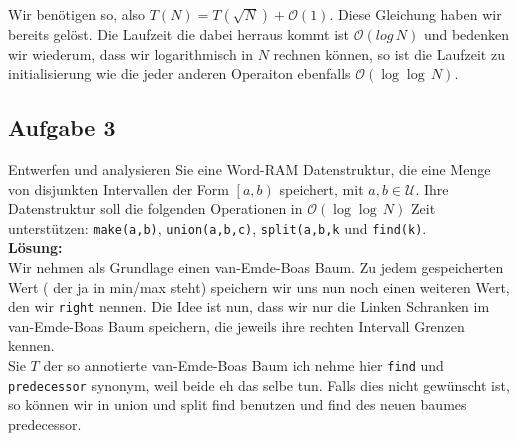 \documentclass[11pt,a4paper,ngerman]{article}
\begin{document}
Wir benötigen so, also $T(N) = T(\sqrt{N}) + \mathcal{O}(1)$. Diese Gleichung haben wir bereits gelöst. Die Laufzeit die dabei herraus kommt ist $\mathcal{O}(log \, N)$ und bedenken wir wiederum, dass wir logarithmisch in $N$ rechnen können, so ist die Laufzeit zu initialisierung wie die jeder anderen Operaiton ebenfalls $\mathcal{O}(\log \log \, N)$.

\subsection*{Aufgabe 3}

Entwerfen und analysieren Sie eine Word-RAM Datenstruktur, die eine Menge von disjunkten Intervallen der Form $\left[a,b\right)$ speichert, mit $a,b \in \mathcal{U}$. Ihre Datenstruktur soll die folgenden Operationen in $\mathcal{O}(\log\log \, N)$ Zeit unterstützen: \lstinline|make(a,b)|, \lstinline|union(a,b,c)|, \lstinline|split(a,b,k| und \lstinline|find(k)|.\\

\noindent\textbf{Lösung:}\\

Wir nehmen als Grundlage einen van-Emde-Boas Baum. Zu jedem gespeicherten Wert ( der ja in min/max steht) speichern wir uns nun noch einen weiteren Wert, den wir \lstinline|right| nennen. Die Idee ist nun, dass wir nur die Linken Schranken im van-Emde-Boas Baum speichern, die jeweils ihre rechten Intervall Grenzen kennen.\\

Sie $T$ der so annotierte van-Emde-Boas Baum ich nehme hier \lstinline|find| und \lstinline|predecessor| synonym, weil beide eh das selbe tun. Falls
dies nicht gewünscht ist, so können wir in union und split find benutzen und find des neuen baumes predecessor.
\end{document}
